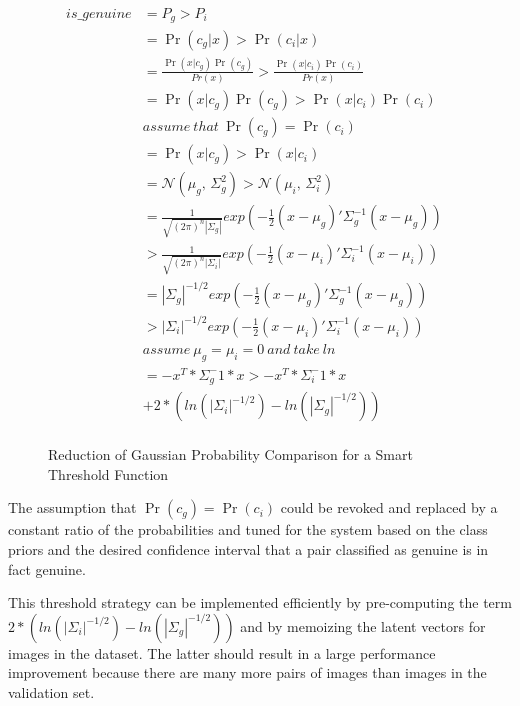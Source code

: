 \begin{figure}
\begin{align*}
is\_genuine & = P_g > P_i&\\
        & = \Pr(c_g|x) > \Pr(c_i|x)&\\
        & = \frac{\Pr(x|c_g)\Pr(c_g)}{Pr(x)} > \frac{\Pr(x|c_i)\Pr(c_i)}{Pr(x)}&\\
        & = \Pr(x|c_g)\Pr(c_g) > \Pr(x|c_i)\Pr(c_i)&\\
        & assume\ that\ \Pr(c_g) = \Pr(c_i)&\\ %
        & = \Pr(x|c_g) > \Pr(x|c_i)&\\
        & = \mathcal{N}(\mu_g,\,\Sigma_g^{2}) > \mathcal{N}(\mu_i,\,\Sigma_i^{2})&\\
        & = \frac{1}{\sqrt{(2\pi)^{n}|\Sigma_g|}}exp(-\frac{1}{2}(x-\mu_g)'\Sigma_g^{-1}(x-\mu_g))&\\
        & > \frac{1}{\sqrt{(2\pi)^{n}|\Sigma_i|}}exp(-\frac{1}{2}(x-\mu_i)'\Sigma_i^{-1}(x-\mu_i))&\\
        & = |\Sigma_g|^{-1/2}exp(-\frac{1}{2}(x-\mu_g)'\Sigma_g^{-1}(x-\mu_g))&\\
        & > |\Sigma_i|^{-1/2}exp(-\frac{1}{2}(x-\mu_i)'\Sigma_i^{-1}(x-\mu_i))&\\
        & assume\ \mu_g = \mu_i = 0\ and\ take\ ln&\\
        & = -x^T * \Sigma_g^-1 * x > -x^T * \Sigma_i^-1 * x &\\
        &    + 2 * (ln(|\Sigma_i|^{-1/2}) - ln(|\Sigma_g|^{-1/2}))&\\
\end{align*}
\caption{Reduction of Gaussian Probability Comparison for a Smart Threshold Function}
\label{proof:gaussian}
\end{figure}

The assumption that $\Pr(c_g) = \Pr(c_i)$ could be revoked and replaced by a constant ratio of the probabilities and tuned for the system based on the class priors and the desired confidence interval that a pair classified as genuine is in fact genuine.

This threshold strategy can be implemented efficiently by pre-computing the term $2 * (ln(|\Sigma_i|^{-1/2}) - ln(|\Sigma_g|^{-1/2}))$ and by memoizing the latent vectors for images in the dataset.
The latter should result in a large performance improvement because there are many more pairs of images than images in the validation set.

